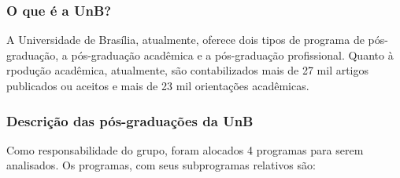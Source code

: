 \documentclass[]{article}
\begin{document}
\subsubsection{O que é a UnB?}\label{o-que-e-a-unb}

A Universidade de Brasília, atualmente, oferece dois tipos de programa
de pós-graduação, a pós-graduação acadêmica e a pós-graduação
profissional. Quanto à rpodução acadêmica, atualmente, são
contabilizados mais de 27 mil artigos publicados ou aceitos e mais de 23
mil orientações acadêmicas.

\subsubsection{Descrição das pós-graduações da
UnB}\label{descricao-das-pos-graduacoes-da-unb}

Como responsabilidade do grupo, foram alocados 4 programas para serem
analisados. Os programas, com seus subprogramas relativos são:
\end{document}
